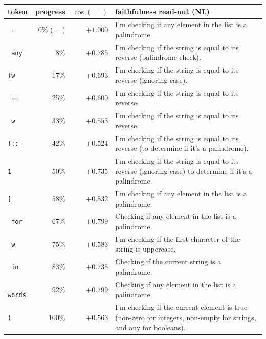 \begin{tabular}{l r r p{7cm}}
\toprule
token & progress & $\cos(=)$ & faithfulness read-out (NL) \\
\midrule
\texttt{ =} & 0\% ($=$) & $+1.000$ & I'm checking if any element in the list is a palindrome. \\
\texttt{ any} & 8\% & $+0.785$ & I'm checking if the string is equal to its reverse (palindrome check). \\
\texttt{(w} & 17\% & $+0.693$ & I'm checking if the string is equal to its reverse (ignoring case). \\
\texttt{ ==} & 25\% & $+0.600$ & I'm checking if the string is equal to its reverse. \\
\texttt{ w} & 33\% & $+0.553$ & I'm checking if the string is equal to its reverse. \\
\texttt{[::-} & 42\% & $+0.524$ & I'm checking if the string is equal to its reverse (to determine if it's a palindrome). \\
\texttt{1} & 50\% & $+0.735$ & I'm checking if the string is equal to its reverse (ignoring case) to determine if it's a palindrome. \\
\texttt{]} & 58\% & $+0.832$ & I'm checking if any element in the list is a palindrome. \\
\texttt{ for} & 67\% & $+0.799$ & Checking if any element in the list is a palindrome. \\
\texttt{ w} & 75\% & $+0.583$ & I'm checking if the first character of the string is uppercase. \\
\texttt{ in} & 83\% & $+0.735$ & Checking if the current string is a palindrome. \\
\texttt{ words} & 92\% & $+0.799$ & Checking if any element in the list is a palindrome. \\
\texttt{)
} & 100\% & $+0.563$ & I'm checking if the current element is true (non-zero for integers, non-empty for strings, and any for booleans). \\
\bottomrule
\end{tabular}
